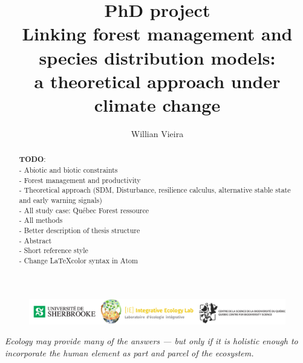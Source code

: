 


\title{
  PhD project \\
  \bigskip
  Linking forest management and species distribution models: \\
  a theoretical approach under climate change
}

\author[1,*]{Willian Vieira}
\date{}



\maketitle

\begin{abstract}

\textbf{TODO}: \\
- Abiotic and biotic constraints \\
- Forest management and productivity \\
- Theoretical approach (SDM, Disturbance, resilience calculus, alternative stable state and early warning signals) \\
- All study case: Québec Forest ressource \\
- All methods \\
- Better description of thesis structure \\
- Abstract \\
- Short reference style \\
- Change \LaTeX color syntax in Atom

\end{abstract}

\vfill
\begin{figure}
\centering\includegraphics[width=16cm]{img/logo.pdf}
\end{figure}
\thispagestyle{empty} %
\clearpage

\thispagestyle{empty}
\tableofcontents
\clearpage


\begin{displayquote}
\centering\textit{Ecology may provide many of the answers — but only if it is holistic enough to incorporate the human element as part and parcel of the ecosystem.} \\ 
\end{displayquote}


